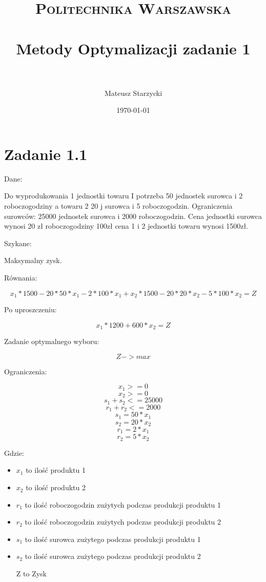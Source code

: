 \documentclass[paper=a4, fontsize=11pt]{scrartcl} %
\title{ 
    \normalfont \normalsize 
    \textsc{Politechnika Warszawska} \\ [25pt] %
    \horrule{0.5pt} \\[0.4cm] %
    \huge Metody Optymalizacji zadanie 1\\ %
    \horrule{2pt} \\[0.5cm] %
}
\author{Mateusz Starzycki} %
\date{\normalsize\today} %
\numberwithin{equation}{section} %
\numberwithin{figure}{section} %
\numberwithin{table}{section} %
\begin{document}
\maketitle %


\section{Zadanie 1.1}

Dane:

Do wyprodukowania 1 jednostki towaru I potrzeba 50 jednostek surowca i 2 roboczogodziny a towaru 2 20 j surowca i 5 roboczogodzin.
Ograniczenia surowców: 25000 jednostek surowca i 2000 roboczogodzin.
Cena jednostki surowca wynosi 20 zł roboczogodziny 100zł cena 1 i 2 jednostki towaru wynosi 1500zł.

Szykane:

Maksymalny zysk.

Równania:

\[x_1 * 1500 - 20 * 50 * x_1 - 2 * 100 * x_1 + x_2 * 1500  - 20 * 20 * x_2 - 5 * 100 * x_2 = Z\]

Po uproszczeniu:

\[x_1 * 1200 + 600 * x_2 = Z\]

Zadanie optymalnego wyboru:

\[Z -> max\]

Ograniczenia:

\[x_1 >= 0\]
\[x_2 >= 0\]
\[s_1 + s_2 <= 25000 \]
\[r_1 + r_2 <= 2000\]
\[s_1 = 50 * x_1\]
\[s_2 = 20 * x_2\]
\[r_1 = 2 * x_1\]
\[r_2 = 5 * x_2\]

Gdzie:
\begin{itemize}
\item $ x_1 $ to ilość produktu 1 
\item $ x_2 $ to ilość produktu 2
\item $ r_1 $ to ilość roboczogodzin zużytych podczas produkcji produktu 1 
\item $ r_2 $ to ilość roboczogodzin zużytych podczas produkcji produktu 2
\item $ s_1 $ to ilość surowca zużytego podczas produkcji produktu 1 
\item $ s_2 $ to ilość surowca zużytego podczas produkcji produktu 2
\item [Z] to Zysk
\end{itemize}
\end{document}
